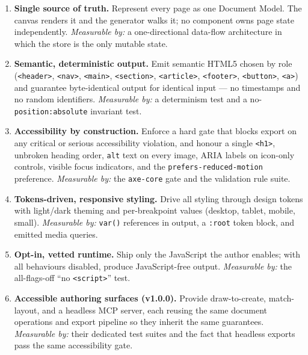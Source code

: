 \begin{enumerate}[label=\textbf{O\arabic*.}, leftmargin=3.2em]
  \item \textbf{Single source of truth.} Represent every page as one Document
        Model. The canvas renders it and the generator walks it; no component owns
        page state independently. \emph{Measurable by:} a one-directional data-flow
        architecture in which the store is the only mutable state.
  \item \textbf{Semantic, deterministic output.} Emit semantic HTML5 chosen by
        role (\texttt{<header>}, \texttt{<nav>}, \texttt{<main>},
        \texttt{<section>}, \texttt{<article>}, \texttt{<footer>}, \texttt{<button>},
        \texttt{<a>}) and guarantee byte-identical output for identical input ---
        no timestamps and no random identifiers. \emph{Measurable by:} a
        determinism test and a no-\texttt{position:absolute} invariant test.
  \item \textbf{Accessibility by construction.} Enforce a hard gate that blocks
        export on any critical or serious accessibility violation, and honour a
        single \texttt{<h1>}, unbroken heading order, \texttt{alt} text on every
        image, ARIA labels on icon-only controls, visible focus indicators, and
        the \texttt{prefers-reduced-motion} preference. \emph{Measurable by:} the
        \texttt{axe-core} gate and the validation rule suite.
  \item \textbf{Tokens-driven, responsive styling.} Drive all styling through
        design tokens with light/dark theming and per-breakpoint values
        (desktop, tablet, mobile, small). \emph{Measurable by:} \texttt{var()}
        references in output, a \texttt{:root} token block, and emitted media
        queries.
  \item \textbf{Opt-in, vetted runtime.} Ship only the JavaScript the author
        enables; with all behaviours disabled, produce JavaScript-free output.
        \emph{Measurable by:} the all-flags-off ``no \texttt{<script>}'' test.
  \item \textbf{Accessible authoring surfaces (v1.0.0).} Provide draw-to-create,
        match-layout, and a headless MCP server, each reusing the same document
        operations and export pipeline so they inherit the same guarantees.
        \emph{Measurable by:} their dedicated test suites and the fact that
        headless exports pass the same accessibility gate.
\end{enumerate}

